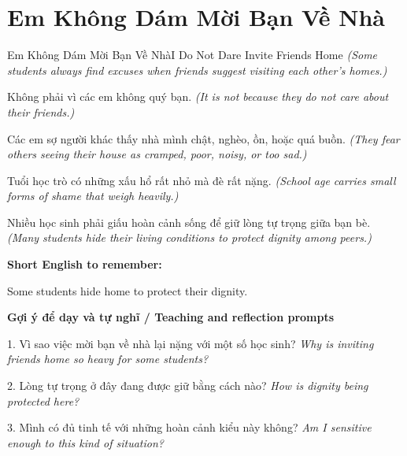 \section{Em Không Dám Mời Bạn Về Nhà}
\begin{truyen}{Em Không Dám Mời Bạn Về Nhà}{I Do Not Dare Invite Friends Home}
\textit{(Some students always find excuses when friends suggest visiting each other's homes.)}

Không phải vì các em không quý bạn.
\textit{(It is not because they do not care about their friends.)}

Các em sợ người khác thấy nhà mình chật, nghèo, ồn, hoặc quá buồn.
\textit{(They fear others seeing their house as cramped, poor, noisy, or too sad.)}

Tuổi học trò có những xấu hổ rất nhỏ mà đè rất nặng.
\textit{(School age carries small forms of shame that weigh heavily.)}

\end{truyen}

\begin{baihoc}
Nhiều học sinh phải giấu hoàn cảnh sống để giữ lòng tự trọng giữa bạn bè.
\textit{(Many students hide their living conditions to protect dignity among peers.)}
\end{baihoc}

\begin{ghinhoanh}
\textbf{Short English to remember:}

Some students hide home to protect their dignity.

\end{ghinhoanh}

\begin{tuhocnhanh}
\textbf{Gợi ý để dạy và tự nghĩ / Teaching and reflection prompts}

1. Vì sao việc mời bạn về nhà lại nặng với một số học sinh? \textit{Why is inviting friends home so heavy for some students?}

2. Lòng tự trọng ở đây đang được giữ bằng cách nào? \textit{How is dignity being protected here?}

3. Mình có đủ tinh tế với những hoàn cảnh kiểu này không? \textit{Am I sensitive enough to this kind of situation?}
\end{tuhocnhanh}
\ngancach

